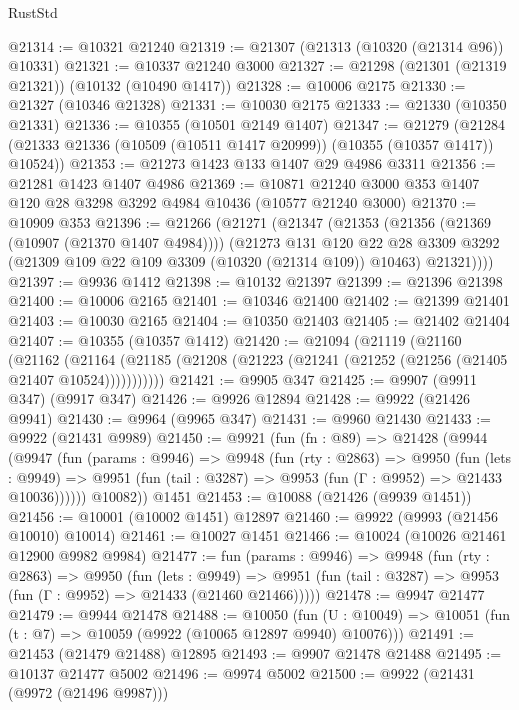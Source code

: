 \begin{lexlean}{RustStd}
\begin{coremodule}
@21314 := @10321 @21240
@21319 := @21307 (@21313 (@10320 (@21314 @96)) @10331)
@21321 := @10337 @21240 @3000
@21327 := @21298 (@21301 (@21319 @21321)) (@10132 (@10490 @1417))
@21328 := @10006 @2175
@21330 := @21327 (@10346 @21328)
@21331 := @10030 @2175
@21333 := @21330 (@10350 @21331)
@21336 := @10355 (@10501 @2149 @1407)
@21347 := @21279
    (@21284 (@21333 @21336 (@10509 (@10511 @1417 @20999)) (@10355 (@10357 @1417)) @10524))
@21353 := @21273 @1423 @133 @1407 @29 @4986 @3311
@21356 := @21281 @1423 @1407 @4986
@21369 := @10871 @21240 @3000 @353 @1407 @120 @28 @3298 @3292 @4984 @10436 (@10577 @21240 @3000)
@21370 := @10909 @353
@21396 := @21266
    (@21271
      (@21347
        (@21353
          (@21356 (@21369 (@10907 (@21370 @1407 @4984))))
          (@21273
            @131
            @120
            @22
            @28
            @3309
            @3292
            (@21309 @109 @22 @109 @3309 (@10320 (@21314 @109)) @10463)
            @21321))))
@21397 := @9936 @1412
@21398 := @10132 @21397
@21399 := @21396 @21398
@21400 := @10006 @2165
@21401 := @10346 @21400
@21402 := @21399 @21401
@21403 := @10030 @2165
@21404 := @10350 @21403
@21405 := @21402 @21404
@21407 := @10355 (@10357 @1412)
@21420 := @21094
    (@21119
      (@21160
        (@21162
          (@21164 (@21185 (@21208 (@21223 (@21241 (@21252 (@21256 (@21405 @21407 @10524)))))))))))
@21421 := @9905 @347
@21425 := @9907 (@9911 @347) (@9917 @347)
@21426 := @9926 @12894
@21428 := @9922 (@21426 @9941)
@21430 := @9964 (@9965 @347)
@21431 := @9960 @21430
@21433 := @9922 (@21431 @9989)
@21450 := @9921
    (fun (fn : @89) =>
    @21428
      (@9944
        (@9947
          (fun (params : @9946) =>
          @9948
            (fun (rty : @2863) =>
            @9950
              (fun (lets : @9949) =>
              @9951 (fun (tail : @3287) => @9953 (fun (Γ : @9952) => @21433 @10036))))))
        @10082))
    @1451
@21453 := @10088 (@21426 (@9939 @1451))
@21456 := @10001 (@10002 @1451) @12897
@21460 := @9922 (@9993 (@21456 @10010) @10014)
@21461 := @10027 @1451
@21466 := @10024 (@10026 @21461 @12900 @9982 @9984)
@21477 := fun (params : @9946) =>
  @9948
    (fun (rty : @2863) =>
    @9950
      (fun (lets : @9949) =>
      @9951 (fun (tail : @3287) => @9953 (fun (Γ : @9952) => @21433 (@21460 @21466)))))
@21478 := @9947 @21477
@21479 := @9944 @21478
@21488 := @10050
    (fun (U : @10049) => @10051 (fun (t : @7) => @10059 (@9922 (@10065 @12897 @9940) @10076)))
@21491 := @21453 (@21479 @21488) @12895
@21493 := @9907 @21478 @21488
@21495 := @10137 @21477 @5002
@21496 := @9974 @5002
@21500 := @9922 (@21431 (@9972 (@21496 @9987)))

\end{coremodule}
\end{lexlean}
